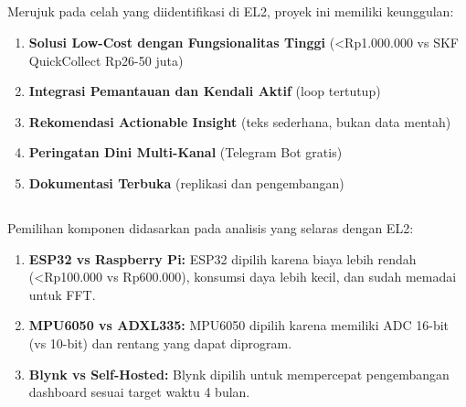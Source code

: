 \documentclass{elsinta}
\begin{document}
\subsection{\AdvantagesTitle}

Merujuk pada celah yang diidentifikasi di EL2, proyek ini memiliki keunggulan:

\begin{enumerate}
    \item \textbf{Solusi Low-Cost dengan Fungsionalitas Tinggi} (<Rp1.000.000 vs SKF QuickCollect Rp26-50 juta)
    \item \textbf{Integrasi Pemantauan dan Kendali Aktif} (loop tertutup)
    \item \textbf{Rekomendasi Actionable Insight} (teks sederhana, bukan data mentah)
    \item \textbf{Peringatan Dini Multi-Kanal} (Telegram Bot gratis)
    \item \textbf{Dokumentasi Terbuka} (replikasi dan pengembangan)
\end{enumerate}

\subsection{\JustificationTitle}

Pemilihan komponen didasarkan pada analisis yang selaras dengan EL2:

\begin{enumerate}
    \item \textbf{ESP32 vs Raspberry Pi:} ESP32 dipilih karena biaya lebih rendah (<Rp100.000 vs Rp600.000), konsumsi daya lebih kecil, dan sudah memadai untuk FFT.
    \item \textbf{MPU6050 vs ADXL335:} MPU6050 dipilih karena memiliki ADC 16-bit (vs 10-bit) dan rentang yang dapat diprogram.
    \item \textbf{Blynk vs Self-Hosted:} Blynk dipilih untuk mempercepat pengembangan dashboard sesuai target waktu 4 bulan.
\end{enumerate}


\section{\ImplementationPlanTitle}

\subsection{\WBSTitle}
\end{document}
